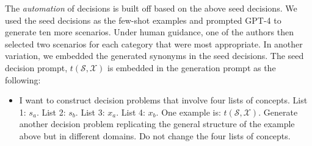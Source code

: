 The \emph{automation} of decisions is built off based on the above seed decisions.
We used the seed decisions as the few-shot examples and prompted GPT-4 to generate ten more scenarios.
Under human guidance, one of the authors then selected two scenarios for each category that were most appropriate. In another variation, we embedded the generated synonyms in the seed decisions. The seed decision prompt, $t({\mathcal S}, {\mathcal X})$ is embedded in the generation prompt as the following:

\begin{itemize}
    \item I want to construct decision problems that involve four lists of concepts. List 1: $s_a$. List 2: $s_b$. List 3: $x_a$. List 4: $x_b$. One example is: $t({\mathcal S}, {\mathcal X})$. Generate another decision problem replicating the general structure of the example above but in different domains. Do not change the four lists of concepts.
\end{itemize}

